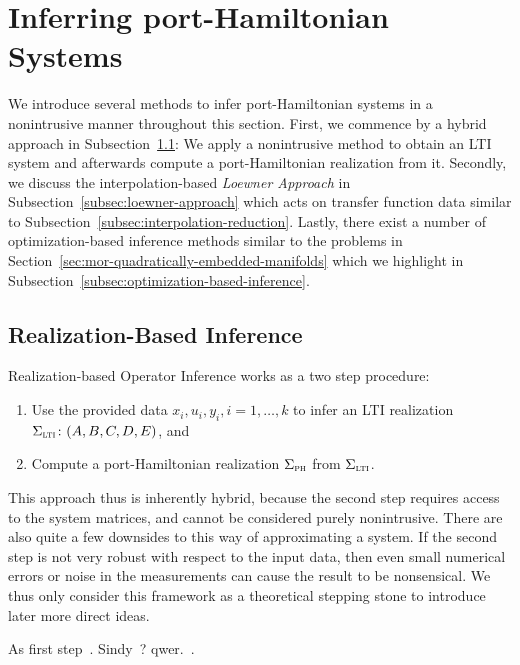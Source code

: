 \section{Inferring port-Hamiltonian Systems}\label{sec:inferring-ph-systems}

We introduce several methods to infer port-Hamiltonian systems in a nonintrusive manner throughout this section.
First, we commence by a hybrid approach in Subsection~\ref{subsec:realization-based-inference}: We apply a nonintrusive method to obtain an LTI system and afterwards compute a port-Hamiltonian realization from it.
Secondly, we discuss the interpolation-based \emph{Loewner Approach} in Subsection~\ref{subsec:loewner-approach} which acts on transfer function data similar to Subsection~\ref{subsec:interpolation-reduction}.
Lastly, there exist a number of optimization-based inference methods similar to the problems in Section~\ref{sec:mor-quadratically-embedded-manifolds} which we highlight in Subsection~\ref{subsec:optimization-based-inference}.

\subsection{Realization-Based Inference}\label{subsec:realization-based-inference}

Realization-based Operator Inference works as a two step procedure:
\begin{enumerate}
    \item Use the provided data $x_i, u_i, y_i, i = 1, \dots, k$ to infer an LTI realization $\Sigma_{\textnormal{\scshape lti}} \colon (A, B, C, D, E)$, and
    \item Compute a port-Hamiltonian realization $\Sigma_{\textnormal{\scshape ph}}$ from $\Sigma_{\textnormal{\scshape lti}}$.
\end{enumerate}
This approach thus is inherently hybrid, because the second step requires access to the system matrices, and cannot be considered purely nonintrusive.
There are also quite a few downsides to this way of approximating a system.
If the second step is not very robust with respect to the input data, then even small numerical errors or noise in the measurements can cause the result to be nonsensical.
We thus only consider this framework as a theoretical stepping stone to introduce later more direct ideas.

As first step~\cite{Miller2012, Gosea2021, Heiland2022, Peherstorfer2016, Peherstorfer2017}.
Sindy~\cite{Brunton2016, Kaiser2018, Kaheman2020, Lee2022}?
qwer.~\cite{Cherifi2019, Beattie2022}.

